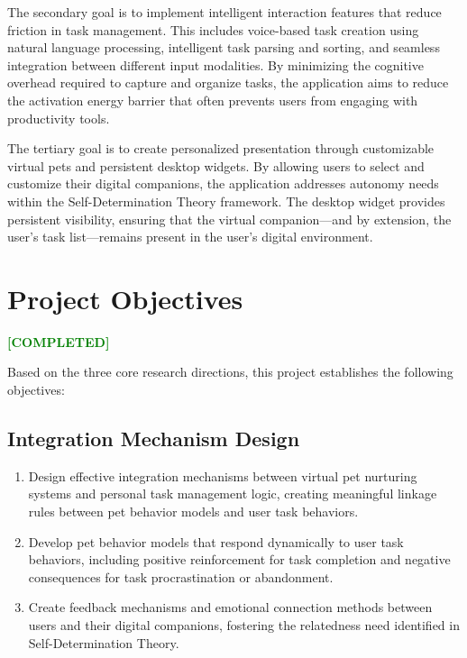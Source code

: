 \documentclass[12pt,a4paper]{report}
\newcommand{\completed}{\textcolor{green}{\textbf{[COMPLETED]}}}
\begin{document}
The secondary goal is to implement intelligent interaction features that reduce friction in task management. This includes voice-based task creation using natural language processing, intelligent task parsing and sorting, and seamless integration between different input modalities. By minimizing the cognitive overhead required to capture and organize tasks, the application aims to reduce the activation energy barrier that often prevents users from engaging with productivity tools.

The tertiary goal is to create personalized presentation through customizable virtual pets and persistent desktop widgets. By allowing users to select and customize their digital companions, the application addresses autonomy needs within the Self-Determination Theory framework. The desktop widget provides persistent visibility, ensuring that the virtual companion---and by extension, the user's task list---remains present in the user's digital environment.

\section{Project Objectives}
\label{sec:objectives}

\completed

Based on the three core research directions, this project establishes the following objectives:

\subsection{Integration Mechanism Design}

\begin{enumerate}
    \item Design effective integration mechanisms between virtual pet nurturing systems and personal task management logic, creating meaningful linkage rules between pet behavior models and user task behaviors.
    
    \item Develop pet behavior models that respond dynamically to user task behaviors, including positive reinforcement for task completion and negative consequences for task procrastination or abandonment.
    
    \item Create feedback mechanisms and emotional connection methods between users and their digital companions, fostering the relatedness need identified in Self-Determination Theory.
\end{enumerate}
\end{document}
